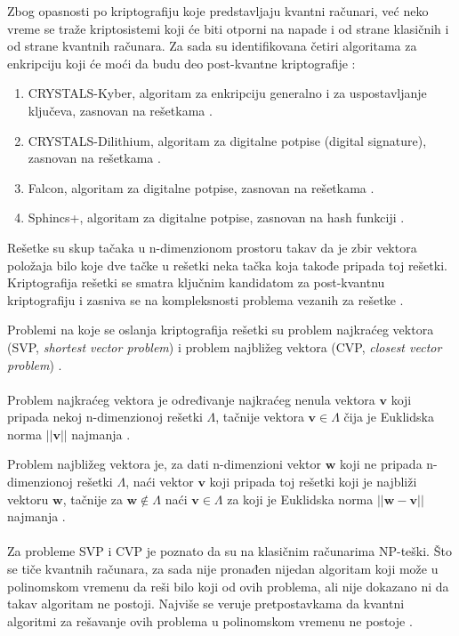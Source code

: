 \documentclass[fleqn, 12pt]{article}
\begin{document}
\begin{text}
Zbog opasnosti po kriptografiju koje predstavljaju kvantni računari, već neko vreme se traže kriptosistemi koji će biti otporni na napade i od strane klasičnih i od strane kvantnih računara. Za sada su identifikovana četiri algoritama za enkripciju koji će moći da budu deo post-kvantne kriptografije \cite{G6}:
\end{text}

\begin{enumerate}
  \item CRYSTALS-Kyber, algoritam za enkripciju generalno i za uspostavljanje ključeva, zasnovan na rešetkama \cite{G6}.
  \item CRYSTALS-Dilithium, algoritam za digitalne potpise (digital signature), zasnovan na rešetkama \cite{G6}.
  \item Falcon, algoritam za digitalne potpise, zasnovan na rešetkama \cite{G6}.
  \item Sphincs+, algoritam za digitalne potpise, zasnovan na hash funkciji \cite{G6}.
\end{enumerate}

\begin{text}
Rešetke su skup tačaka u n-dimenzionom prostoru takav da je zbir vektora položaja bilo koje dve tačke u rešetki neka tačka koja takođe pripada toj rešetki. Kriptografija rešetki se smatra ključnim kandidatom za post-kvantnu kriptografiju i zasniva se na kompleksnosti problema vezanih za rešetke \cite{G6}.
\end{text}

\begin{text}
Problemi na koje se oslanja kriptografija rešetki su problem najkraćeg vektora (SVP, \textit{shortest vector problem}) i problem najbližeg vektora (CVP, \textit{closest vector problem}) \cite{G6}.
\\\\

Problem najkraćeg vektora je određivanje najkraćeg nenula vektora \(\mathbf{v}\) koji pripada nekoj n-dimenzionoj rešetki \(\Lambda\), tačnije vektora \(\mathbf{v} \in \Lambda\) čija je Euklidska norma \(||\mathbf{v}||\) najmanja \cite{G6}.

Problem najbližeg vektora je, za dati n-dimenzioni vektor \(\mathbf{w}\) koji ne pripada n-dimenzionoj rešetki \(\Lambda\), naći vektor \(\mathbf{v}\) koji pripada toj rešetki koji je najbliži vektoru \(\mathbf{w}\), tačnije za \(\mathbf{w} \notin \Lambda\) naći \(\mathbf{v} \in \Lambda\) za koji je Euklidska norma \(||\mathbf{w} - \mathbf{v}||\) najmanja \cite{G6}.
\\\\

Za probleme SVP i CVP je poznato da su na klasičnim računarima NP-teški. Što se tiče kvantnih računara, za sada nije pronađen nijedan algoritam koji može u polinomskom vremenu da reši bilo koji od ovih problema, ali nije dokazano ni da takav algoritam ne postoji. Najviše se veruje pretpostavkama da kvantni algoritmi za rešavanje ovih problema u polinomskom vremenu ne postoje \cite{G6}.
\end{text}
\end{document}
